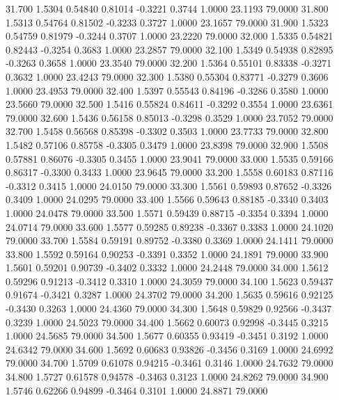   31.700   1.5304   0.54840   0.81014  -0.3221   0.3744   1.0000  23.1193  79.0000
  31.800   1.5313   0.54764   0.81502  -0.3233   0.3727   1.0000  23.1657  79.0000
  31.900   1.5323   0.54759   0.81979  -0.3244   0.3707   1.0000  23.2220  79.0000
  32.000   1.5335   0.54821   0.82443  -0.3254   0.3683   1.0000  23.2857  79.0000
  32.100   1.5349   0.54938   0.82895  -0.3263   0.3658   1.0000  23.3540  79.0000
  32.200   1.5364   0.55101   0.83338  -0.3271   0.3632   1.0000  23.4243  79.0000
  32.300   1.5380   0.55304   0.83771  -0.3279   0.3606   1.0000  23.4953  79.0000
  32.400   1.5397   0.55543   0.84196  -0.3286   0.3580   1.0000  23.5660  79.0000
  32.500   1.5416   0.55824   0.84611  -0.3292   0.3554   1.0000  23.6361  79.0000
  32.600   1.5436   0.56158   0.85013  -0.3298   0.3529   1.0000  23.7052  79.0000
  32.700   1.5458   0.56568   0.85398  -0.3302   0.3503   1.0000  23.7733  79.0000
  32.800   1.5482   0.57106   0.85758  -0.3305   0.3479   1.0000  23.8398  79.0000
  32.900   1.5508   0.57881   0.86076  -0.3305   0.3455   1.0000  23.9041  79.0000
  33.000   1.5535   0.59166   0.86317  -0.3300   0.3433   1.0000  23.9645  79.0000
  33.200   1.5558   0.60183   0.87116  -0.3312   0.3415   1.0000  24.0150  79.0000
  33.300   1.5561   0.59893   0.87652  -0.3326   0.3409   1.0000  24.0295  79.0000
  33.400   1.5566   0.59643   0.88185  -0.3340   0.3403   1.0000  24.0478  79.0000
  33.500   1.5571   0.59439   0.88715  -0.3354   0.3394   1.0000  24.0714  79.0000
  33.600   1.5577   0.59285   0.89238  -0.3367   0.3383   1.0000  24.1020  79.0000
  33.700   1.5584   0.59191   0.89752  -0.3380   0.3369   1.0000  24.1411  79.0000
  33.800   1.5592   0.59164   0.90253  -0.3391   0.3352   1.0000  24.1891  79.0000
  33.900   1.5601   0.59201   0.90739  -0.3402   0.3332   1.0000  24.2448  79.0000
  34.000   1.5612   0.59296   0.91213  -0.3412   0.3310   1.0000  24.3059  79.0000
  34.100   1.5623   0.59437   0.91674  -0.3421   0.3287   1.0000  24.3702  79.0000
  34.200   1.5635   0.59616   0.92125  -0.3430   0.3263   1.0000  24.4360  79.0000
  34.300   1.5648   0.59829   0.92566  -0.3437   0.3239   1.0000  24.5023  79.0000
  34.400   1.5662   0.60073   0.92998  -0.3445   0.3215   1.0000  24.5685  79.0000
  34.500   1.5677   0.60355   0.93419  -0.3451   0.3192   1.0000  24.6342  79.0000
  34.600   1.5692   0.60683   0.93826  -0.3456   0.3169   1.0000  24.6992  79.0000
  34.700   1.5709   0.61078   0.94215  -0.3461   0.3146   1.0000  24.7632  79.0000
  34.800   1.5727   0.61578   0.94578  -0.3463   0.3123   1.0000  24.8262  79.0000
  34.900   1.5746   0.62266   0.94899  -0.3464   0.3101   1.0000  24.8871  79.0000
